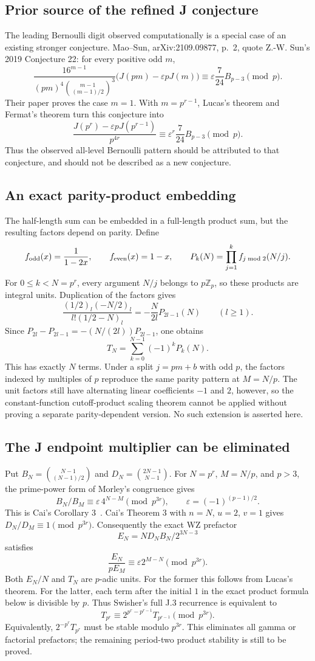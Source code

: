 \documentclass[11pt,letterpaper]{article}
\numberwithin{equation}{section}
\begin{document}
\subsection{Prior source of the refined J conjecture}
The leading Bernoulli digit observed computationally is a special case
of an existing stronger conjecture. Mao--Sun, arXiv:2109.09877, p.~2,
quote Z.-W. Sun's 2019 Conjecture 22: for every positive odd $m$,
\[
 \frac{16^{m-1}}{(pm)^4\binom{m-1}{(m-1)/2}^{3}}
 \bigl(J(pm)-\varepsilon pJ(m)\bigr)
 \equiv\varepsilon\frac7{24}B_{p-3}\pmod p.
\]
Their paper proves the case $m=1$. With $m=p^{r-1}$, Lucas's theorem
and Fermat's theorem turn this conjecture into
\[
 \frac{J(p^r)-\varepsilon pJ(p^{r-1})}{p^{4r}}
 \equiv\varepsilon^r\frac7{24}B_{p-3}\pmod p.
\]
Thus the observed all-level Bernoulli pattern should be attributed to
that conjecture, and should not be described as a new conjecture.

\subsection{An exact parity-product embedding}
The half-length sum can be embedded in a full-length product sum, but
the resulting factors depend on parity. Define
\[
 f_{\rm odd}(x)=\frac1{1-2x},\qquad f_{\rm even}(x)=1-x,
 \qquad P_k(N)=\prod_{j=1}^{k}f_{j\bmod2}(N/j).
\]
For $0\le k<N=p^r$, every argument $N/j$ belongs to $p\mathbb Z_p$,
so these products are integral units. Duplication of the factors gives
\[
 \frac{(1/2)_l(-N/2)_l}{l!(1/2-N)_l}
 =-\frac{N}{2l}P_{2l-1}(N)\qquad(l\ge1).
\]
Since $P_{2l}-P_{2l-1}=-(N/(2l))P_{2l-1}$, one obtains
\[
 \boxed{T_N=\sum_{k=0}^{N-1}(-1)^kP_k(N).}
\]
This has exactly $N$ terms. Under a split $j=pm+b$ with odd $p$, the
factors indexed by multiples of $p$ reproduce the same parity pattern
at $M=N/p$. The unit factors still have alternating linear
coefficients $-1$ and $2$, however, so the constant-function
cutoff-product scaling theorem cannot be applied without proving a
separate parity-dependent version. No such extension is asserted here.
\subsection{The J endpoint multiplier can be eliminated}
Put $B_N=\binom{N-1}{(N-1)/2}$ and $D_N=\binom{2N-1}{N-1}$.
For $N=p^r$, $M=N/p$, and $p>3$, the prime-power form of Morley's
congruence gives
\[
 B_N/B_M\equiv\varepsilon\,4^{N-M}\pmod{p^{3r}},
 \qquad \varepsilon=(-1)^{(p-1)/2}.
\]
This is Cai's Corollary 3~\cite{II-Cai2002}.
Cai's Theorem 3 with $n=N$, $u=2$, $v=1$ gives $D_N/D_M\equiv1\pmod{p^{3r}}$.
Consequently the exact WZ prefactor
\[
 E_N=ND_NB_N/2^{3N-3}
\]
satisfies
\[
 \frac{E_N}{pE_M}\equiv\varepsilon 2^{M-N}\pmod{p^{3r}}.
\]
Both $E_N/N$ and $T_N$ are $p$-adic units. For the former this follows
from Lucas's theorem. For the latter, each term after the initial $1$
in the exact product formula below is divisible by $p$.
Thus Swisher's full J.3 recurrence is equivalent to
\[
 T_{p^r}\equiv2^{p^r-p^{r-1}}T_{p^{r-1}}\pmod{p^{3r}}.
\]
Equivalently, $2^{-p^r}T_{p^r}$ must be stable modulo $p^{3r}$.
This eliminates all gamma or factorial prefactors; the remaining
period-two product stability is still to be proved.
\end{document}
